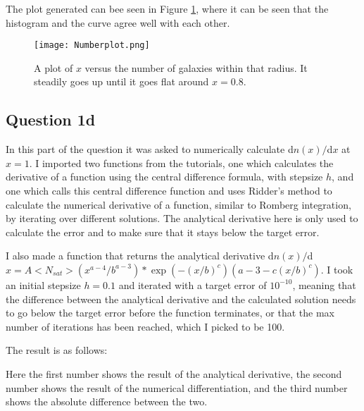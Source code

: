 The plot generated can bee seen in Figure \ref{fig:Nr}, where it can be seen that the histogram and the curve agree well with each other.

\begin{figure}[h!]
  \centering
  \texttt{[image: Numberplot.png]}
  \caption{A plot of $x$ versus the number of galaxies within that radius. It steadily goes up until it goes flat around $x = 0.8$.}
  \label{fig:Nr}
\end{figure}



\subsection{Question 1d}

In this part of the question it was asked to numerically calculate d$n(x)/$d$x$ at $x = 1$.
I imported two functions from the tutorials, one which calculates the derivative of a function using the central difference formula, with stepsize $h$, and one which calls this central difference function and uses Ridder's method to calculate the numerical derivative of a function, similar to Romberg integration, by iterating over different solutions. 
The analytical derivative here is only used to calculate the error and to make sure that it stays below the target error.

I also made a function that returns the analytical derivative d$n(x)/$d$x = A <N_{sat}> (x^{a-4}/b^{a-3})*\exp(-(x/b)^c)  (a-3-c (x/b)^c)$.
I took an initial stepsize $h = 0.1$ and iterated with a target error of $10^{-10}$, meaning that the difference between the analytical derivative and the calculated solution needs to go below the target error before the function terminates, or that the max number of iterations has been reached, which I picked to be 100.

The result is as follows:



Here the first number shows the result of the analytical derivative, the second number shows the result of the numerical differentiation, and the third number shows the absolute difference between the two.



